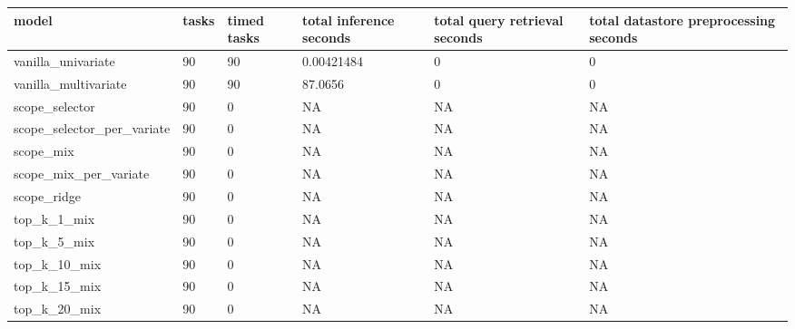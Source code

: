 \begin{tabular}{llllll}
\toprule
model & tasks & timed tasks & total inference seconds & total query retrieval seconds & total datastore preprocessing seconds \\
\midrule
vanilla\_univariate & 90 & 90 & 0.00421484 & 0 & 0 \\
vanilla\_multivariate & 90 & 90 & 87.0656 & 0 & 0 \\
scope\_selector & 90 & 0 & NA & NA & NA \\
scope\_selector\_per\_variate & 90 & 0 & NA & NA & NA \\
scope\_mix & 90 & 0 & NA & NA & NA \\
scope\_mix\_per\_variate & 90 & 0 & NA & NA & NA \\
scope\_ridge & 90 & 0 & NA & NA & NA \\
top\_k\_1\_mix & 90 & 0 & NA & NA & NA \\
top\_k\_5\_mix & 90 & 0 & NA & NA & NA \\
top\_k\_10\_mix & 90 & 0 & NA & NA & NA \\
top\_k\_15\_mix & 90 & 0 & NA & NA & NA \\
top\_k\_20\_mix & 90 & 0 & NA & NA & NA \\
\bottomrule
\end{tabular}
